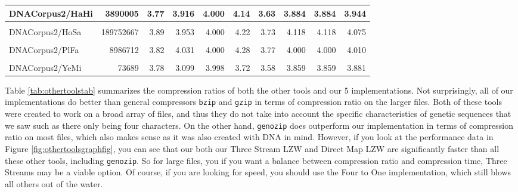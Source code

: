 \documentclass[12pt,twoside]{reedthesis}
\begin{document}
\begin{table}[!h]
{\begin{tabular}[t]{l|r|r|r|r|r|r|r|r|r}
\hline
DNACorpus2/HaHi & 3890005 & 3.77 & 3.916 & 4.000 & 4.14 & 3.63 & 3.884 & 3.884 & 3.944\\
\hline
\cellcolor{gray!6}{DNACorpus2/HePy} & \cellcolor{gray!6}{1667825} & \cellcolor{gray!6}{3.77} & \cellcolor{gray!6}{3.884} & \cellcolor{gray!6}{4.000} & \cellcolor{gray!6}{4.14} & \cellcolor{gray!6}{3.67} & \cellcolor{gray!6}{3.894} & \cellcolor{gray!6}{3.894} & \cellcolor{gray!6}{3.942}\\
\hline
DNACorpus2/HoSa & 189752667 & 3.89 & 3.953 & 4.000 & 4.22 & 3.73 & 4.118 & 4.118 & 4.075\\
\hline
\cellcolor{gray!6}{DNACorpus2/OrSa} & \cellcolor{gray!6}{43262523} & \cellcolor{gray!6}{3.73} & \cellcolor{gray!6}{3.843} & \cellcolor{gray!6}{4.000} & \cellcolor{gray!6}{4.21} & \cellcolor{gray!6}{3.65} & \cellcolor{gray!6}{3.858} & \cellcolor{gray!6}{3.858} & \cellcolor{gray!6}{3.908}\\
\hline
DNACorpus2/PlFa & 8986712 & 3.82 & 4.031 & 4.000 & 4.28 & 3.77 & 4.000 & 4.000 & 4.010\\
\hline
\cellcolor{gray!6}{DNACorpus2/ScPo} & \cellcolor{gray!6}{10652155} & \cellcolor{gray!6}{3.68} & \cellcolor{gray!6}{3.847} & \cellcolor{gray!6}{4.000} & \cellcolor{gray!6}{4.07} & \cellcolor{gray!6}{3.57} & \cellcolor{gray!6}{3.813} & \cellcolor{gray!6}{3.813} & \cellcolor{gray!6}{3.851}\\
\hline
DNACorpus2/YeMi & 73689 & 3.78 & 3.099 & 3.998 & 3.72 & 3.58 & 3.859 & 3.859 & 3.881\\
\hline
\end{tabular}}
\end{table}
Table \ref{tab:othertoolstab} summarizes the compression ratios of both the other tools and our 5 implementations. Not surprisingly, all of our implementations do better than general compressors \texttt{bzip} and \texttt{gzip} in terms of compression ratio on the larger files. Both of these tools were created to work on a broad array of files, and thus they do not take into account the specific characteristics of genetic sequences that we saw such as there only being four characters. On the other hand, \texttt{genozip} does outperform our implementation in terms of compression ratio on most files, which also makes sense as it was also created with DNA in mind. However, if you look at the performance data in Figure \ref{fig:othertoolsgraphfig}, you can see that our both our Three Stream LZW and Direct Map LZW are significantly faster than all these other tools, including \texttt{genozip}. So for large files, you if you want a balance between compression ratio and compression time, Three Streams may be a viable option. Of course, if you are looking for speed, you should use the Four to One implementation, which still blows all others out of the water.
\end{document}
